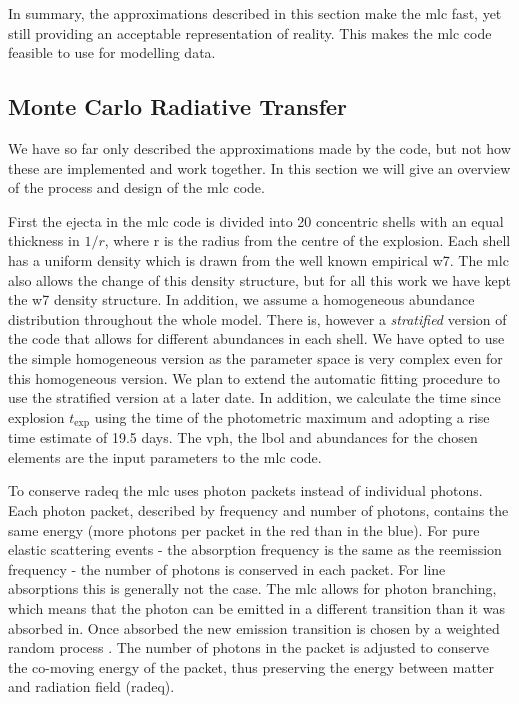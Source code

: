 In summary, the approximations described in this section make the \gls{mlc} fast, yet still providing an acceptable representation of reality. This makes the \gls{mlc} code feasible to use for modelling data. 

\subsection{Monte Carlo Radiative Transfer}

We have so far only described the approximations made by the code, but not how these are implemented and work together. In this section we will give an overview of the process and design of the \gls{mlc} code.

First the ejecta in the \gls{mlc} code is divided into 20 concentric shells with an equal thickness in $1/r$, where r is the radius from the centre of the explosion. Each shell has a uniform density which is drawn from the well known empirical \gls{w7}. The \gls{mlc} also allows the change of this density structure, but for all this work we have kept the \gls{w7} density structure. In addition, we assume a homogeneous abundance distribution throughout the whole model. There is, however a \textit{stratified} version of the code that allows for different abundances in each shell. We have opted to use the simple homogeneous version as the parameter space is very complex even for this homogeneous version. We plan to extend the automatic fitting procedure to use the stratified version at a later date. In addition, we calculate the time since explosion $t_\textrm{exp}$ using the time of the photometric maximum and adopting a rise time estimate of 19.5 days. The \gls{vph}, the \gls{lbol} and abundances for the chosen elements are the input parameters to the \gls{mlc} code. 

To conserve \gls{radeq} the \gls{mlc} uses photon packets instead of individual photons. Each photon packet, described by  frequency and number of photons, contains the same energy (more photons per packet in the red than in the blue). For pure elastic scattering events - the absorption frequency is the same as the reemission frequency - the number of photons is conserved in each packet. For line absorptions this is generally not the case. The \gls{mlc} allows for photon branching, which means that the photon can be emitted in a different transition than it was absorbed in. Once absorbed the new emission transition is chosen by a weighted random process \citep[for a more details see][]{2000A&A...363..705M}. The number of photons in the packet is adjusted to conserve the co-moving energy of the packet, thus preserving the energy between matter and radiation field (\gls{radeq}).


